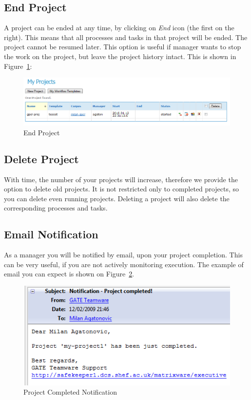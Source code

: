 \subsection{End Project}
 A project can be ended at any time, by clicking on \emph{End} icon (the first
 on the right). This means that all processes and tasks in that project will be
 ended. The project cannot be resumed later. This option is useful if manager wants to 
stop the work on the project, but leave the project history intact.
This is shown in Figure~\ref{fig:endproject}:
\begin{figure}[htb]
\centering
\includegraphics[scale=0.4]{endproject}
\caption{End Project}
\label{fig:endproject}
\end{figure}

\subsection{Delete Project}
With time, the number of your projects will increase, therefore we provide the
option to delete old projects.
It is not restricted only to completed projects, so you can delete even 
running projects. Deleting a project will also delete the
corresponding processes and tasks.

\subsection{Email Notification}
As a manager you will be notified by email, upon your project completion.
This can be very useful, if you are not actively monitoring execution.
The example of email you can expect is shown on
Figure~\ref{fig:projectcompletednotification}.
\begin{figure}[htb]
\centering
\includegraphics[scale=0.4]{projectcompletednotification}
\caption{Project Completed Notification}
\label{fig:projectcompletednotification}
\end{figure}

